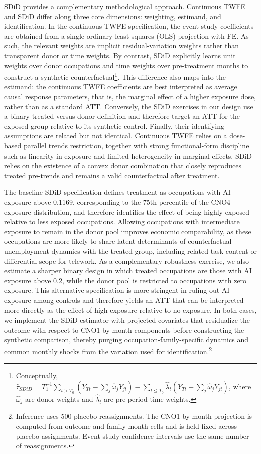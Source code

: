 \documentclass[11pt]{article}
\begin{document}
SDiD provides a complementary methodological approach. Continuous TWFE and SDiD differ along three core dimensions: weighting, estimand, and identification. In the continuous TWFE specification, the event-study coefficients are obtained from a single ordinary least squares (OLS) projection with FE. As such, the relevant weights are implicit residual-variation weights rather than transparent donor or time weights. By contrast, SDiD explicitly learns unit weights over donor occupations and time weights over pre-treatment months to construct a synthetic counterfactual\footnote{Conceptually, \(\widehat{\tau}_{SDiD}=T_1^{-1}\sum_{t>T_0}\left(\overline{Y}_{Tt}-\sum_j\widehat{\omega}_jY_{jt}\right)-\sum_{t\leq T_0}\widehat{\lambda}_t\left(\overline{Y}_{Tt}-\sum_j\widehat{\omega}_jY_{jt}\right)\), where \(\widehat{\omega}_j\) are donor weights and \(\widehat{\lambda}_t\) are pre-period time weights.}. This difference also maps into the estimand: the continuous TWFE coefficients are best interpreted as average causal response parameters, that is, the marginal effect of a higher exposure dose, rather than as a standard ATT. Conversely, the SDiD exercises in our design use a binary treated-versus-donor definition and therefore target an ATT for the exposed group relative to its synthetic control. Finally, their identifying assumptions are related but not identical. Continuous TWFE relies on a dose-based parallel trends restriction, together with strong functional-form discipline such as linearity in exposure and limited heterogeneity in marginal effects. SDiD relies on the existence of a convex donor combination that closely reproduces treated pre-trends and remains a valid counterfactual after treatment.

The baseline SDiD specification defines treatment as occupations with AI exposure above 0.1169, corresponding to the 75th percentile of the CNO4 exposure distribution, and therefore identifies the effect of being highly exposed relative to less exposed occupations. Allowing occupations with intermediate exposure to remain in the donor pool improves economic comparability, as these occupations are more likely to share latent determinants of counterfactual unemployment dynamics with the treated group, including related task content or differential scope for telework. As a complementary robustness exercise, we also estimate a sharper binary design in which treated occupations are those with AI exposure above 0.2, while the donor pool is restricted to occupations with zero exposure. This alternative specification is more stringent in ruling out AI exposure among controls and therefore yields an ATT that can be interpreted more directly as the effect of high exposure relative to no exposure. In both cases, we implement the SDiD estimator with projected covariates that residualize the outcome with respect to CNO1-by-month components before constructing the synthetic comparison, thereby purging occupation-family-specific dynamics and common monthly shocks from the variation used for identification.\footnote{Inference uses 500 placebo reassignments. The CNO1-by-month projection is computed from outcome and family-month cells and is held fixed across placebo assignments. Event-study confidence intervals use the same number of reassignments.}
\end{document}
